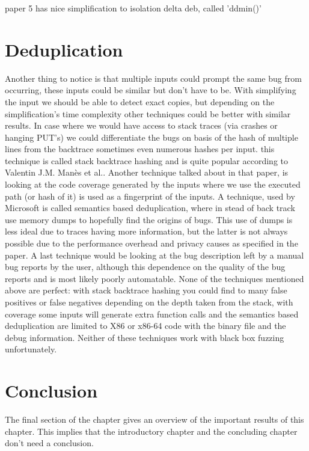 
 paper 5 has nice simplification to isolation delta deb, called 'ddmin()'

\section{Deduplication}
Another thing to notice is that multiple inputs could prompt the same bug from occurring, these inputs could be similar but don't have to be. With simplifying the input we should be able to detect exact copies, but depending on the simplification's time complexity other techniques could be better with similar results. In case where we would have access to stack traces (via crashes or hanging PUT's) we could differentiate the bugs on basis of the hash of multiple lines from the backtrace sometimes even numerous hashes per input. this technique is called stack backtrace hashing and is quite popular according to Valentin J.M. Man\`es et al.\cite{13manes2019survey}. Another technique talked about in that paper, is looking at the code coverage generated by the inputs where we use the executed path (or hash of it) is used as a fingerprint of the inputs. A technique, used by Microsoft\cite{36semanticsAwareDeduplicationRETracer} is called semantics based deduplication, where in stead of back track use memory dumps to hopefully find the origins of bugs. This use of dumps is less ideal due to traces having more information, but the latter is not always possible due to the performance overhead and privacy causes as specified in the paper. A last technique would be looking at the bug description left by a manual bug reports by the user, although this dependence on the quality of the bug reports and is most likely poorly automatable. None of the techniques mentioned above are perfect: with stack backtrace hashing you could find to many false positives or false negatives depending on the depth taken from the stack, with coverage some inputs will generate extra function calls and the semantics based deduplication are limited to X86 or x86-64 code with the binary file and the debug information. Neither of these techniques work with black box fuzzing unfortunately.

\section{Conclusion}
The final section of the chapter gives an overview of the important results
of this chapter. This implies that the introductory chapter and the
concluding chapter don't need a conclusion.


